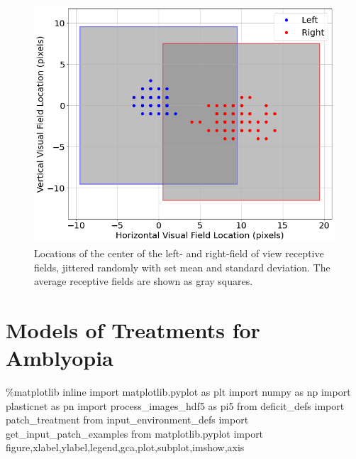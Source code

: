 \documentclass[
  letterpaper,
]{book}
\newenvironment{Shaded}{\begin{snugshade}}{\end{snugshade}}
\newcommand{\ImportTok}[1]{\textcolor[rgb]{0.00,0.46,0.62}{#1}}
\newcommand{\NormalTok}[1]{\textcolor[rgb]{0.00,0.23,0.31}{#1}}
\newcommand{\OperatorTok}[1]{\textcolor[rgb]{0.37,0.37,0.37}{#1}}
\begin{document}
\begin{figure}[H]

{\centering \includegraphics{./Deficit Models_files/figure-pdf/fig-jitter-input-locations-output-1.png}

}

\caption{\label{fig-jitter-input-locations}Locations of the center of
the left- and right-field of view receptive fields, jittered randomly
with set mean and standard deviation. The average receptive fields are
shown as gray squares.}

\end{figure}

\hypertarget{sec-models-of-treatments}{%
\chapter{Models of Treatments for
Amblyopia}\label{sec-models-of-treatments}}

\begin{Shaded}
\begin{Highlighting}[]
\OperatorTok{\%}\NormalTok{matplotlib inline}
\ImportTok{import}\NormalTok{ matplotlib.pyplot }\ImportTok{as}\NormalTok{ plt}
\ImportTok{import}\NormalTok{ numpy }\ImportTok{as}\NormalTok{ np}
\ImportTok{import}\NormalTok{ plasticnet }\ImportTok{as}\NormalTok{ pn}
\ImportTok{import}\NormalTok{ process\_images\_hdf5 }\ImportTok{as}\NormalTok{ pi5}
\ImportTok{from}\NormalTok{ deficit\_defs }\ImportTok{import}\NormalTok{ patch\_treatment}
\ImportTok{from}\NormalTok{ input\_environment\_defs }\ImportTok{import}\NormalTok{ get\_input\_patch\_examples}
\ImportTok{from}\NormalTok{ matplotlib.pyplot }\ImportTok{import}\NormalTok{ figure,xlabel,ylabel,legend,gca,plot,subplot,imshow,axis}
\end{Highlighting}
\end{Shaded}
\end{document}
